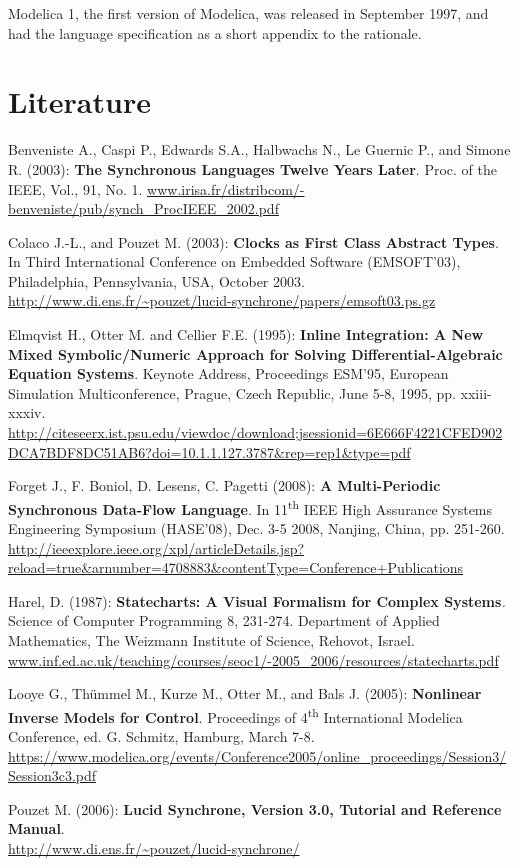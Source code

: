 \documentclass[10pt,a4paper]{report}
\def\doublelabel#1{\label{#1}\hypertarget{#1}{}}
\begin{document}
Modelica 1, the first version of Modelica, was released in September
1997, and had the language specification as a short appendix to the
rationale.

\chapter{Literature}\doublelabel{literature}

Benveniste A., Caspi P., Edwards S.A., Halbwachs N., Le Guernic P., and
Simone R. (2003): \textbf{The Synchronous Languages Twelve Years Later}.
Proc. of the IEEE, Vol., 91, No. 1.
\href{http://www.irisa.fr/distribcom/benveniste/pub/synch_ProcIEEE_2002.pdf}{www.irisa.fr/distribcom/-benveniste/pub/synch\_ProcIEEE\_2002.pdf}

Colaco J.-L., and Pouzet M. (2003): \textbf{Clocks as First Class
Abstract Types}. In Third International Conference on Embedded Software
(EMSOFT'03), Philadelphia, Pennsylvania, USA, October 2003.\\
\url{http://www.di.ens.fr/~pouzet/lucid-synchrone/papers/emsoft03.ps.gz}

Elmqvist H., Otter M. and Cellier F.E. (1995): \textbf{Inline
Integration: A New Mixed Symbolic/Numeric Approach for Solving
Differential-Algebraic Equation Systems}. Keynote Address, Proceedings
ESM'95, European Simulation Multiconference, Prague, Czech Republic,
June 5-8, 1995, pp. xxiii-xxxiv.
\url{http://citeseerx.ist.psu.edu/viewdoc/download;jsessionid=6E666F4221CFED902DCA7BDF8DC51AB6?doi=10.1.1.127.3787\&rep=rep1\&type=pdf}

Forget J., F. Boniol, D. Lesens, C. Pagetti (2008): \textbf{A
Multi-Periodic Synchronous Data-Flow Language}. In
11\textsuperscript{th} IEEE High Assurance Systems Engineering Symposium
(HASE'08), Dec. 3-5 2008, Nanjing, China, pp. 251-260.
\url{http://ieeexplore.ieee.org/xpl/articleDetails.jsp?reload=true\&arnumber=4708883\&contentType=Conference+Publications}

Harel, D. (1987): \textbf{Statecharts: A Visual Formalism for Complex
Systems}\emph{.} Science of Computer Programming 8, 231-274. Department
of Applied Mathematics, The Weizmann Institute of Science, Rehovot,
Israel.
\href{http://www.inf.ed.ac.uk/teaching/courses/seoc1/2005_2006/resources/statecharts.pdf}{www.inf.ed.ac.uk/teaching/courses/seoc1/-2005\_2006/resources/statecharts.pdf}

Looye G., Thümmel M., Kurze M., Otter M., and Bals J. (2005):
\textbf{Nonlinear Inverse Models for Control}. Proceedings of
4\textsuperscript{th} International Modelica Conference, ed. G. Schmitz,
Hamburg, March 7-8.\\
\url{https://www.modelica.org/events/Conference2005/online_proceedings/Session3/Session3c3.pdf}

Pouzet M. (2006): \textbf{Lucid Synchrone, Version 3.0, Tutorial and
Reference Manual}.\\
\url{http://www.di.ens.fr/~pouzet/lucid-synchrone/}
\end{document}
